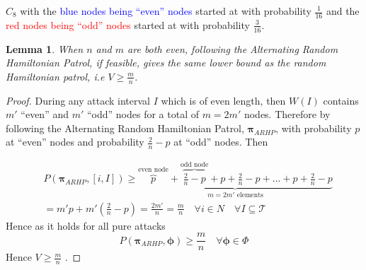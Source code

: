 \documentclass[a4paper,10pt]{article}
\newtheorem{lemma}[theorem]{Lemma}
\theoremstyle{definition}
\theoremstyle{definition}
\theoremstyle{remark}
\theoremstyle{definition}
\begin{document}
\begin{examplefigure}
\begin{center}
\end{center}
\caption{ $C_{8}$ with the \textcolor{blue}{blue nodes being ``even'' nodes} started at with probability $\frac{1}{16}$ and the \textcolor{red}{red nodes being ``odd'' nodes} started at with probability $\frac{3}{16}$.}
\end{examplefigure}

\begin{lemma}
When $n$ and $m$ are both even, following the Alternating Random Hamiltonian Patrol, if feasible, gives the same lower bound as the random Hamiltonian patrol, i.e $V \geq \frac{m}{n}$.
\end{lemma}

\begin{proof}
During any attack interval $I$ which is of even length, then $W(I)$ contains $m'$ ``even'' and $m'$ ``odd'' nodes for a total of $m=2m'$ nodes. Therefore by following the Alternating Random Hamiltonian Patrol, $\pmb{\pi}_{ARHP}$, with probability $p$ at ``even'' nodes and probability $\frac{2}{n}-p$ at ``odd'' nodes. Then

\begin{align*}
&P(\bm{\pi}_{ARHP},[i,I]) \geq \underbrace{\overbrace{p}^{\text{even node}}+\overbrace{\frac{2}{n}-p}^{\text{odd node}}+p+\frac{2}{n}-p+...+p+\frac{2}{n}-p}_{m=2m' \text{ elements}} \\
&=m' p+m'(\frac{2}{n}-p)=\frac{2m'}{n}=\frac{m}{n} \quad \forall i \in N \quad \forall I \subseteq \mathcal{T}
\end{align*}
Hence as it holds for all pure attacks
$$P(\bm{\pi}_{ARHP},\bm{\phi}) \geq \frac{m}{n} \quad \forall \bm{\phi} \in \Phi$$
Hence $V \geq \frac{m}{n}$ .
\end{proof}
\end{document}
